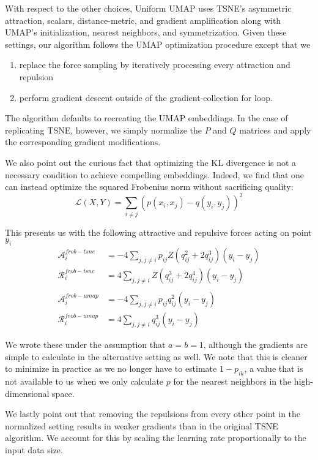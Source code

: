 \documentclass[sigconf, nonacm]{acmart}
\newcommand\ourmethod{Uniform UMAP }
\begin{document}
With respect to the other choices, \ourmethod uses TSNE's asymmetric attraction, scalars, distance-metric, and gradient amplification along with UMAP's
initialization, nearest neighbors, and symmetrization. Given these settings, our algorithm follows the UMAP optimization procedure except that we
\begin{enumerate}
        \item replace the force sampling by iteratively processing every attraction and repulsion
        \item perform gradient descent outside of the gradient-collection for loop.
\end{enumerate}
The algorithm defaults to recreating the UMAP embeddings. In the case of replicating TSNE, however, we simply normalize the $P$ and $Q$ matrices and apply the
corresponding gradient modifications.

We also point out the curious fact that optimizing the KL divergence is not a necessary condition to achieve compelling embeddings. Indeed, we find that one can
instead optimize the squared Frobenius norm without sacrificing quality:
\[ \mathcal{L}(X, Y) = \sum_{i \neq j} (p(x_i, x_j) - q(y_i, y_j))^2 \]

This presents us with the following attractive and repulsive forces acting on point $y_i$
\begin{align*}
    \mathcal{A}_i^{frob-tsne} &= -4 \sum_{j, j \neq i} p_{ij} Z (q_{ij}^2 + 2q_{ij}^3) (y_i - y_j) \\
    \mathcal{R}_i^{frob-tsne} &= 4 \sum_{j, j \neq i} Z( q_{ij}^3 + 2q_{ij}^4) (y_i - y_j) \\
    &\\
    \mathcal{A}_i^{frob-umap} &= -4 \sum_{j, j \neq i} p_{ij} q_{ij}^2 (y_i - y_j) \\
    \mathcal{R}_i^{frob-umap} &= 4 \sum_{j, j \neq i} q_{ij}^3 (y_i - y_j)  
\end{align*}

We wrote these under the assumption that $a = b = 1$, although the gradients are simple to calculate in the alternative setting as well. We note that this is
cleaner to minimize in practice as we no longer have to estimate $1 - p_{ik}$, a value that is not available to us when we only calculate $p$ for the nearest
neighbors in the high-dimensional space.

We lastly point out that removing the repulsions from every other point in the normalized setting results in weaker gradients than in the original TSNE
algorithm. We account for this by scaling the learning rate proportionally to the input data size.
\end{document}
